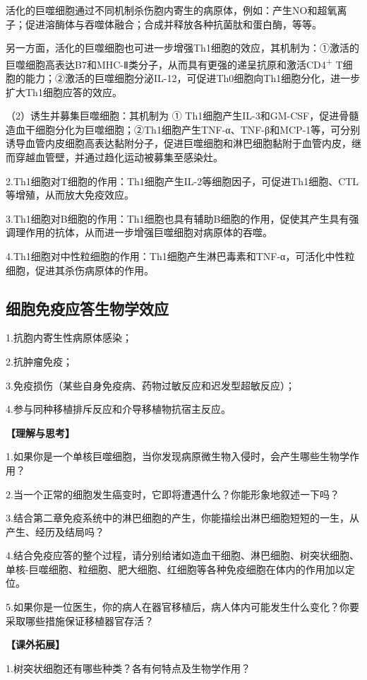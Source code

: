 活化的巨噬细胞通过不同机制杀伤胞内寄生的病原体，例如：产生NO和超氧离子；促进溶酶体与吞噬体融合；合成并释放各种抗菌肽和蛋白酶，等等。

另一方面，活化的巨噬细胞也可进一步增强Th1细胞的效应，其机制为：①激活的巨噬细胞高表达B7和MHC-Ⅱ类分子，从而具有更强的递呈抗原和激活CD4\textsuperscript{+}
T细胞的能力；②激活的巨噬细胞分泌IL-12，可促进Th0细胞向Th1细胞分化，进一步扩大Th1细胞应答的效应。

（2）诱生并募集巨噬细胞：其机制为 ①
Th1细胞产生IL-3和GM-CSF，促进骨髓造血干细胞分化为巨噬细胞；②Th1细胞产生TNF-α、TNF-β和MCP-1等，可分别诱导血管内皮细胞高表达黏附分子，促进巨噬细胞和淋巴细胞黏附于血管内皮，继而穿越血管壁，并通过趋化运动被募集至感染灶。

2.Th1细胞对T细胞的作用：Th1细胞产生IL-2等细胞因子，可促进Th1细胞、CTL等增殖，从而放大免疫效应。

3.Th1细胞对B细胞的作用：Th1细胞也具有辅助B细胞的作用，促使其产生具有强调理作用的抗体，从而进一步增强巨噬细胞对病原体的吞噬。

4.Th1细胞对中性粒细胞的作用：Th1细胞产生淋巴毒素和TNF-α，可活化中性粒细胞，促进其杀伤病原体的作用。


\subsection{细胞免疫应答生物学效应}

1.抗胞内寄生性病原体感染；

2.抗肿瘤免疫；

3.免疫损伤（某些自身免疫病、药物过敏反应和迟发型超敏反应）；

4.参与同种移植排斥反应和介导移植物抗宿主反应。

\noindent\textbf{【理解与思考】}

1.如果你是一个单核巨噬细胞，当你发现病原微生物入侵时，会产生哪些生物学作用？

2.当一个正常的细胞发生癌变时，它即将遭遇什么？你能形象地叙述一下吗？

3.结合第二章免疫系统中的淋巴细胞的产生，你能描绘出淋巴细胞短短的一生，从产生、经历及结局吗？

4.结合免疫应答的整个过程，请分别给诸如造血干细胞、淋巴细胞、树突状细胞、单核-巨噬细胞、粒细胞、肥大细胞、红细胞等各种免疫细胞在体内的作用加以定位。

5.如果你是一位医生，你的病人在器官移植后，病人体内可能发生什么变化？你要采取哪些措施保证移植器官存活？

\noindent\textbf{【课外拓展】}

1.树突状细胞还有哪些种类？各有何特点及生物学作用？

